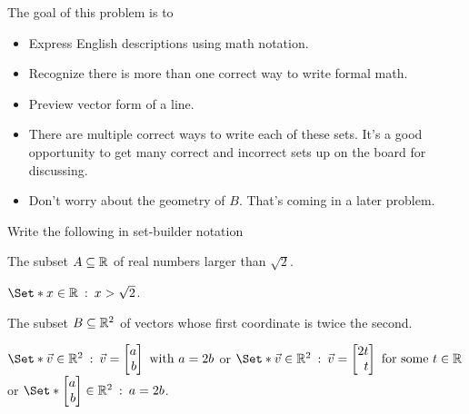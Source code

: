 \begin{slide}
	\bookonlynewpage
	\question
	\begin{annotation}
		\begin{goals}

			The goal of this problem is to
			\begin{itemize}
				\item Express English descriptions using math notation.
				\item Recognize there is more than one correct way to
					write formal math.
				\item Preview vector form of a line.
			\end{itemize}
		\end{goals}

		\begin{notes}
			\begin{itemize}
				\item There are multiple correct ways to write
					each of these sets. It's a good opportunity
					to get many correct and incorrect sets up on the
					board for discussing.
				\item Don't worry about the geometry of $B$. That's coming
					in a later problem.
			\end{itemize}
		\end{notes}
	\end{annotation}
		Write the following in set-builder notation
	\begin{parts}
			\item The subset $A\subseteq \mathbb{R}$ of real numbers larger than $\sqrt{2}$.
				\begin{solution}
					$\Set*{x\in\R \given x>\sqrt{2}}$.
				\end{solution}
			\item The subset $B\subseteq \mathbb{R}^2$ of vectors whose first coordinate
			is twice the second.
				\begin{solution}
					$\Set*{\vec v\in\R^2\given \vec v=\mat{a\\b}\text{ with }a=2b}$
					or
					$\Set*{\vec v\in\R^2\given\vec v=\mat{2t\\t}\text{ for some }t\in \R}$\\
					or
					$\Set*{\mat{a\\b}\in\R^2\given a=2b}$.
				\end{solution}
	\end{parts}
\end{slide}

